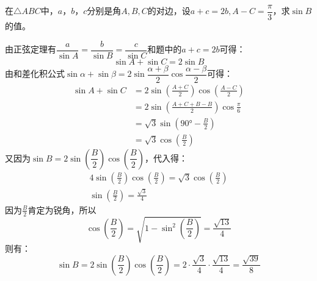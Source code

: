 \documentclass[answers]{exam}
\begin{document}
\begin{questions}
\begin{solution}
\begin{enumerate}[label=\protect\circled{\arabic*}]
			      \begin{center}
			      \end{center}

		\end{enumerate}
	\end{solution}
	\question 在$\triangle{ABC}$中，$a$，$b$，$c$分别是角$A,B,C$的对边，设$a+c=2b,
		A-C=\dfrac{\pi}{3}$，求$\sin{B}$的值。

	\begin{solution}
		由正弦定理有$\dfrac{a}{\sin{A}}=\dfrac{b}{\sin{B}}=\dfrac{c}{\sin{C}}$和题中的$a+c=2b$可得：
		\begin{equation*}
			\sin{A} + \sin{C} = 2\sin{B}
		\end{equation*}
		由和差化积公式$\sin\alpha + \sin\beta = 2\sin{\dfrac{\alpha+\beta}{2}}\cos{\dfrac{\alpha-\beta}{2}}$可得：
		\begin{align*}
			\sin{A} + \sin{C} & = 2\sin \left( \frac{A+C}{2} \right)\cos \left( \frac{A-C}{2} \right) \\
			                  & = 2\sin \left( \frac{A+C+B - B}{2} \right) \cos{\frac{\pi}{6}}        \\
			                  & = \sqrt{3}\sin(\ang{90}-\frac{B}{2})                                  \\
			                  & = \sqrt{3}\cos\left(\frac{B}{2}\right)
		\end{align*}
		又因为$\sin{B}=2\sin\left(\dfrac{B}{2}\right)\cos\left(\dfrac{B}{2}\right)$，代入得：
		\begin{align*}
			4\sin\left(\frac{B}{2}\right)\cos\left(\frac{B}{2}\right) = \sqrt{3}\cos\left(\frac{B}{2}\right) \\
			\sin\left(\frac{B}{2}\right) = \frac{\sqrt{3}}{4}
		\end{align*}
		因为$\frac{B}{2}$肯定为锐角，所以
		\begin{equation*}
			\cos\left(\frac{B}{2}\right) = \sqrt{1 - \sin^2 \left(\frac{B}{2}\right)}= \frac{\sqrt{13}}{4}
		\end{equation*}
		则有：
		\begin{equation*}
			\sin{B} = 2\sin{\left( \frac{B}{2} \right)} \cos{\left( \frac{B}{2}
				\right)}=2\cdot\frac{\sqrt{3}}{4}\cdot\frac{\sqrt{13}}{4} = \frac{\sqrt{39}}{8}
		\end{equation*}
	\end{solution}


\end{questions}
\end{document}
